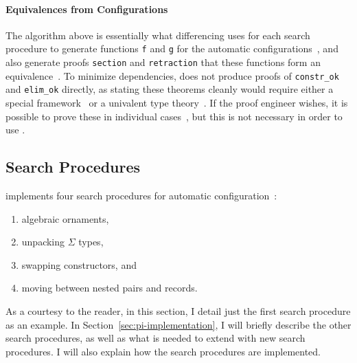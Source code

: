 \paragraph{Equivalences from Configurations}
The algorithm above is essentially what differencing uses for each search procedure to generate functions \lstinline{f} and \lstinline{g} for the automatic configurations~\href{https://github.com/uwplse/pumpkin-pi/blob/v2.0.0/plugin/src/automation/search/search.ml}{}, %
and also generate proofs \lstinline{section} and \lstinline{retraction} that these functions form an equivalence~\href{https://github.com/uwplse/pumpkin-pi/blob/v2.0.0/plugin/src/automation/search/equivalence.ml}{}. %
To minimize dependencies, \toolnamec does not produce proofs of \lstinline{constr_ok} and \lstinline{elim_ok} directly,
as stating these theorems cleanly would require either a special framework~\cite{tabareau2017equivalences}
or a univalent type theory~\cite{univalent2013homotopy}.
If the proof engineer wishes, it is possible to prove these in individual cases~\href{https://github.com/uwplse/pumpkin-pi/blob/v2.0.0/plugin/coq/playground/arbitrary.v}{}, %
but this is not necessary in order to use \toolnamec. %

\subsection{Search Procedures}
\label{sec:proc}

\toolnamec implements four search procedures for automatic configuration~\href{https://github.com/uwplse/pumpkin-pi/blob/v2.0.0/plugin/src/automation/lift/liftconfig.ml}{}:

\begin{enumerate}
\item algebraic ornaments,
\item unpacking $\Sigma$ types,
\item swapping constructors, and
\item moving between nested pairs and records.
\end{enumerate}
As a courtesy to the reader, in this section, I detail just the first search procedure as an example.
In Section~\ref{sec:pi-implementation}, I will briefly describe the other search procedures,
as well as what is needed to extend \toolnamec with new search procedures.
I will also explain how the search procedures are implemented.

